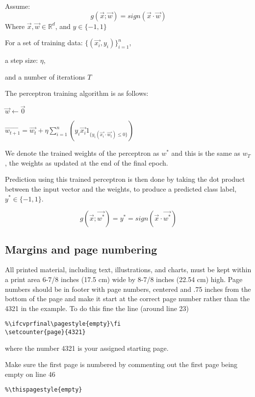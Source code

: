 \documentclass[10pt,twocolumn,a4paper]{article}
\begin{document}
Assume:
\[ g(\vec{x}; \vec{w}) = sign(\vec{x} \cdot \vec{w}) \]
Where $ \vec{x},\vec{w} \in \mathbb{R}^d $, and $y \in \{-1, 1\} $

For a set of training data: $ \{(\vec{x_i}, y_i)\}_{i=1}^n $,

a step size: $\eta$,

and a number of iterations $T$

The perceptron training algorithm is as follows:
\begin{algorithmic}
\State $\vec{w} \gets \vec{0}$


    $\vec{w_{t+1}} = \vec{w_t} + \eta \sum_{i=1}^n(y_i \vec{x_i} 1_{\{ y_i (\vec{x_i} \cdot \vec{w_t}  ) \leq 0 \}})$
\EndFor
\end{algorithmic}

We denote the trained weights of the perceptron as $w^*$ and this is the same as $w_T$, the weights as updated at the end of the final epoch.

Prediction using this trained perceptron is then done by taking the dot product between the input vector and the weights, to produce a predicted class label, $y^* \in \{-1, 1\}$.

\[ g(\vec{x}; \vec{w^*}) = y^* = sign(\vec{x} \cdot \vec{w^*} ) \]

\subsection{Margins and page numbering}

All printed material, including text, illustrations, and charts, must be kept
within a print area 6-7/8 inches (17.5 cm) wide by 8-7/8 inches (22.54 cm)
high.
Page numbers should be in footer with page numbers, centered and .75
inches from the bottom of the page and make it start at the correct page
number rather than the 4321 in the example.  To do this fine the line (around
line 23)
\begin{verbatim}
%\ifcvprfinal\pagestyle{empty}\fi
\setcounter{page}{4321}
\end{verbatim}
where the number 4321 is your assigned starting page.

Make sure the first page is numbered by commenting out the first page being
empty on line 46
\begin{verbatim}
%\thispagestyle{empty}
\end{verbatim}
\end{document}
